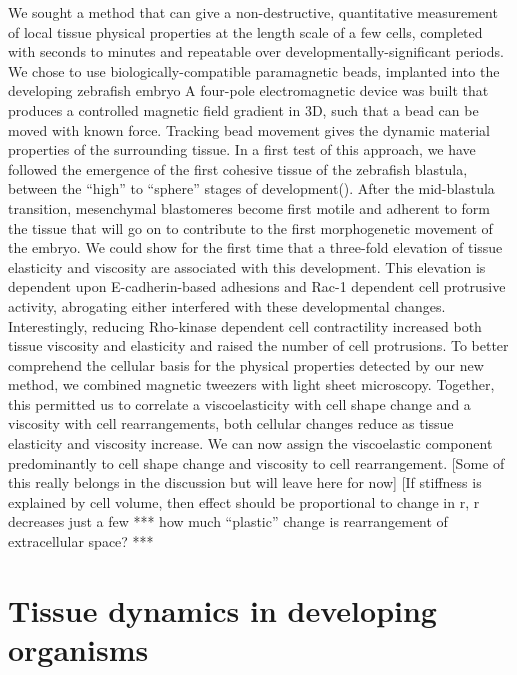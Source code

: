 We sought a method that can give a non-destructive, quantitative measurement of local tissue physical properties at the length scale of a few cells, completed with seconds to minutes and repeatable over developmentally-significant periods.
We chose to use biologically-compatible paramagnetic beads, implanted into the developing zebrafish embryo
A four-pole electromagnetic device was built that produces a controlled magnetic field gradient in 3D, such that a bead can be moved with known force.
Tracking bead movement gives the dynamic material properties of the surrounding tissue.
In a first test of this approach, we have followed the emergence of the first cohesive tissue of the zebrafish blastula, between the “high” to “sphere” stages of development().
After the mid-blastula transition, mesenchymal blastomeres become first motile and adherent to form the tissue that will go on to contribute to the first morphogenetic movement of the embryo.
We could show for the first time that a three-fold elevation of tissue elasticity and viscosity are associated with this development.
This elevation is dependent upon E-cadherin-based adhesions and Rac-1 dependent cell protrusive activity, abrogating either interfered with these developmental changes.
Interestingly, reducing Rho-kinase dependent cell contractility increased both tissue viscosity and elasticity and raised the number of cell protrusions.
To better comprehend the cellular basis for the physical properties detected by our new method, we combined magnetic tweezers with light sheet microscopy.
Together, this permitted us to correlate a viscoelasticity with cell shape change and a viscosity with cell rearrangements, both cellular changes reduce as tissue elasticity and viscosity increase.
We can now assign the viscoelastic component predominantly to cell shape change and viscosity to cell rearrangement.
[Some of this really belongs in the discussion but will leave here for now]
[If stiffness is explained by cell volume, then effect should be proportional to change in r, r decreases just a few %
*** how much “plastic” change is rearrangement of extracellular space? ***

\section{Tissue dynamics in developing organisms}
